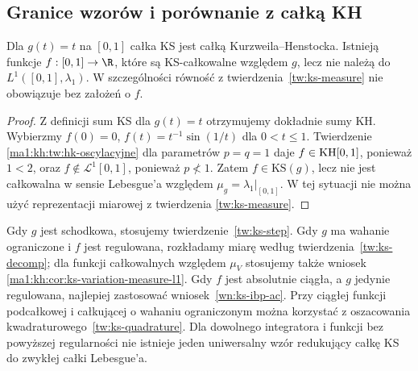 \subsection*{Granice wzorów i porównanie z całką KH}
\begin{stwierdzenie}
Dla $g(t)=t$ na $[0,1]$ całka KS jest całką Kurzweila--Henstocka. Istnieją funkcje $f:[0,1]\to\R$, które są KS-całkowalne względem $g$, lecz nie należą do $L^1([0,1],\lambda_1)$. W szczególności równość z twierdzenia~\ref{tw:ks-measure} nie obowiązuje bez założeń o $f$.
\end{stwierdzenie}
\begin{proof}
Z definicji sum KS dla $g(t)=t$ otrzymujemy dokładnie
sumy KH. Wybierzmy $f(0)=0$, $f(t)=t^{-1}\sin(1/t)$
dla $0<t\le1$. Twierdzenie
\ref{ma1:kh:tw:hk-oscylacyjne} dla parametrów $p=q=1$
daje $f\in\mathrm{KH}[0,1]$, ponieważ $1<2$, oraz
$f\notin\mathcal L^1[0,1]$, ponieważ $p\not<1$.
Zatem $f\in\mathrm{KS}(g)$, lecz nie jest całkowalna
w sensie Lebesgue'a względem $\mu_g=\lambda_1|_{[0,1]}$.
W tej sytuacji nie można użyć reprezentacji miarowej
z twierdzenia \ref{tw:ks-measure}.
\end{proof}

\begin{uwaga}
Gdy $g$ jest schodkowa, stosujemy twierdzenie~\ref{tw:ks-step}. Gdy $g$ ma wahanie ograniczone i $f$ jest regulowana, rozkładamy miarę według twierdzenia~\ref{tw:ks-decomp}; dla funkcji całkowalnych względem $\mu_V$ stosujemy także wniosek \ref{ma1:kh:cor:ks-variation-measure-l1}. Gdy $f$ jest absolutnie ciągła, a $g$ jedynie regulowana, najlepiej zastosować wniosek~\ref{wn:ks-ibp-ac}. Przy ciągłej funkcji podcałkowej i całkującej o wahaniu ograniczonym można korzystać z oszacowania kwadraturowego~\ref{tw:ks-quadrature}. Dla dowolnego integratora i funkcji bez powyższej regularności nie istnieje jeden uniwersalny wzór redukujący całkę KS do zwykłej całki Lebesgue'a.
\end{uwaga}



